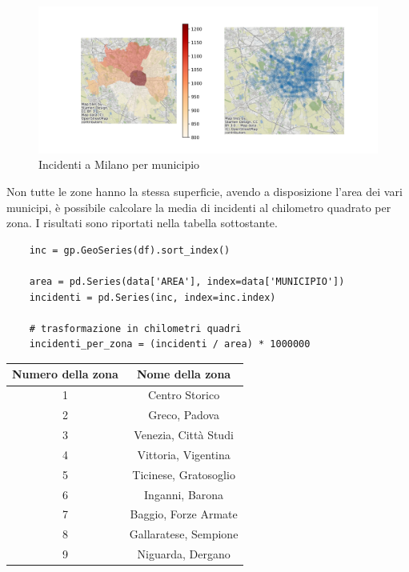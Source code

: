 \documentclass[a4paper]{report}
\begin{document}
\begin{figure}
    \includegraphics[width=\linewidth]{../src/municipi_milano/incidenti_municipio.png}
    \caption{Incidenti a Milano per municipio}
    \label{fig:heatmap-municipi}
\end{figure}

Non tutte le zone hanno la stessa superficie, avendo a disposizione l'area dei vari municipi, 
è possibile calcolare la media di incidenti al chilometro quadrato per zona.
I risultati sono riportati nella tabella sottostante.

\begin{lstlisting}    
    inc = gp.GeoSeries(df).sort_index()

    area = pd.Series(data['AREA'], index=data['MUNICIPIO'])
    incidenti = pd.Series(inc, index=inc.index)

    # trasformazione in chilometri quadri
    incidenti_per_zona = (incidenti / area) * 1000000 
\end{lstlisting}

\begin{center}
    \def\arraystretch{1.5}%
    \begin{tabular}{ |c|c| } 
    \hline
    Numero della zona & Nome della zona \\ 
    \hline
    \rowcolor{TableGray}
    1   &   Centro Storico\\
    2   &   Greco, Padova\\
    \rowcolor{TableGray}
    3   &   Venezia, Città Studi\\
    4   &   Vittoria, Vigentina \\
    \rowcolor{TableGray}
    5   &   Ticinese, Gratosoglio\\
    6   &   Inganni, Barona\\
    \rowcolor{TableGray}
    7   &   Baggio, Forze Armate\\
    8   &   Gallaratese, Sempione\\
    \rowcolor{TableGray}
    9   &   Niguarda, Dergano\\
    \hline
    \end{tabular}
\end{center}
\end{document}
